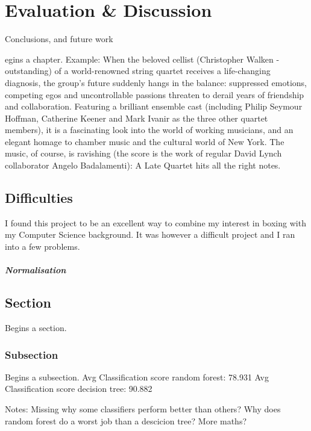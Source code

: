 %
%
\let\textcircled=\pgftextcircled
\chapter{Evaluation & Discussion}
\label{chap:intro}

Conclusions, and future work

egins a chapter. Example: When the beloved cellist (Christopher Walken - outstanding) of a world-renowned string quartet receives a life-changing diagnosis, the group's future suddenly hangs in the balance: suppressed emotions, competing egos and uncontrollable passions threaten to derail years of friendship and collaboration. Featuring a brilliant ensemble cast (including Philip Seymour Hoffman, Catherine Keener and Mark Ivanir as the three other quartet members), it is a fascinating look into the world of working musicians, and an elegant homage to chamber music and the cultural world of New York. The music, of course, is ravishing (the score is the work of regular David Lynch collaborator Angelo Badalamenti): A Late Quartet hits all the right notes.


\section{Difficulties}
I found this project to be an excellent way to combine my interest in boxing with my Computer Science background. It was however a difficult project and I ran into a few problems.

\paragraph{Normalisation}


\section{Section}
\label{sec:sec01}

Begins a section.

\subsection{Subsection}
\label{subsec:subsec01}

Begins a subsection.
Avg Classification score random forest: 78.931%
Avg Classification score decision tree: 90.882%

Notes:
Missing why some classifiers perform better than others?
Why does random forest do a worst job than a descicion tree?
More maths?

